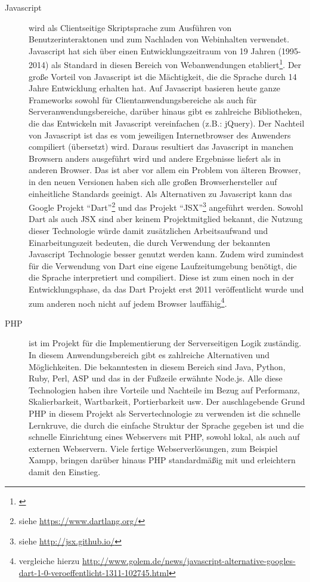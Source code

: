 \begin{description}
  \item[Javascript] wird als Clientseitige Skriptsprache zum Ausführen von Benutzerinteraktonen und zum Nachladen von Webinhalten verwendet. Javascript hat sich über einen Entwicklungszeitraum von 19 Jahren (1995-2014) als Standard in diesen Bereich von Webanwendungen etabliert\footnote{\citet{powers2007}}. Der große Vorteil von Javascript ist die Mächtigkeit, die die Sprache durch 14 Jahre Entwicklung erhalten hat. Auf Javascript basieren heute ganze Frameworks sowohl für Clientanwendungsbereiche als auch für Serveranwendungsbereiche\footnotemark, darüber hinaus gibt es zahlreiche Bibliotheken, die das Entwickeln mit Javascript vereinfachen (z.B.: jQuery). Der Nachteil von Javascript ist das es vom jeweiligen Internetbrowser des Anwenders compiliert (übersetzt) wird. Daraus resultiert das Javascript in manchen Browsern anders ausgeführt wird und andere Ergebnisse liefert als in anderen Browser. Das ist aber vor allem ein Problem von älteren Browser, in den neuen Versionen haben sich alle großen Browserhersteller auf einheitliche Standards geeinigt. Als Alternativen zu Javascript kann das Google Projekt "`Dart"'\footnote{siehe \url{https://www.dartlang.org/}} und das Projekt "`JSX"'\footnote{siehe \url{http://jsx.github.io/}} angeführt werden. Sowohl Dart als auch JSX sind aber keinem Projektmitglied bekannt, die Nutzung dieser Technologie würde damit zusätzlichen Arbeitsaufwand und Einarbeitungszeit bedeuten, die durch Verwendung der bekannten Javascript Technologie besser genutzt werden kann. Zudem wird zumindest für die Verwendung von Dart eine eigene Laufzeitumgebung benötigt, die die Sprache interpretiert und compiliert. Diese ist zum einen noch in der Entwicklungsphase, da das Dart Projekt erst 2011 veröffentlicht wurde und zum anderen noch nicht auf jedem Browser lauffähig\footnote{vergleiche hierzu \url{http://www.golem.de/news/javascript-alternative-googles-dart-1-0-veroeffentlicht-1311-102745.html}}.


  \item[PHP] ist im Projekt für die Implementierung der Serverseitigen Logik zuständig. In diesem Anwendungsbereich gibt es zahlreiche Alternativen und Möglichkeiten. Die bekanntesten in diesem Bereich sind Java, Python, Ruby, Perl, ASP und das in der Fußzeile erwähnte Node.js. Alle diese Technologien haben ihre Vorteile und Nachteile im Bezug auf Performanz, Skalierbarkeit, Wartbarkeit, Portierbarkeit usw. Der auschlagebende Grund PHP in diesem Projekt als Servertechnologie zu verwenden ist die schnelle Lernkruve, die durch die einfache Struktur der Sprache gegeben ist und die schnelle Einrichtung eines Webservers mit PHP, sowohl lokal, als auch auf externen Webservern. Viele fertige Webserverlösungen, zum Beispiel Xampp, bringen darüber hinaus PHP standardmäßig mit und erleichtern damit den Einstieg.


\end{description}
